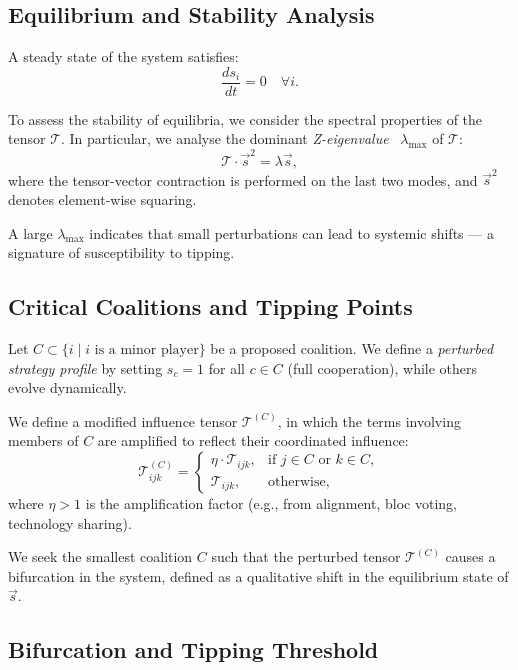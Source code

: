 \documentclass[11pt]{article}
\begin{document}
\subsection{Equilibrium and Stability Analysis}

A steady state of the system satisfies:
\begin{equation}
	\frac{ds_i}{dt} = 0 \quad \forall i.
\end{equation}

To assess the stability of equilibria, we consider the spectral properties of the tensor $\mathcal{T}$. In particular, we analyse the dominant \textit{Z-eigenvalue}~\citep{qi2005eigenvalues} $\lambda_{\max}$ of $\mathcal{T}$:
\begin{equation}
	\mathcal{T} \cdot \vec{s}^2 = \lambda \vec{s},
\end{equation}
where the tensor-vector contraction is performed on the last two modes, and $\vec{s}^2$ denotes element-wise squaring.

A large $\lambda_{\max}$ indicates that small perturbations can lead to systemic shifts — a signature of susceptibility to tipping.

\subsection{Critical Coalitions and Tipping Points}

Let $C \subset \{i \mid i \text{ is a minor player} \}$ be a proposed coalition. We define a \textit{perturbed strategy profile} by setting $s_c = 1$ for all $c \in C$ (full cooperation), while others evolve dynamically.

We define a modified influence tensor $\mathcal{T}^{(C)}$, in which the terms involving members of $C$ are amplified to reflect their coordinated influence:
\[
\mathcal{T}^{(C)}_{ijk} = 
\begin{cases}
	\eta \cdot \mathcal{T}_{ijk}, & \text{if } j \in C \text{ or } k \in C, \\
	\mathcal{T}_{ijk}, & \text{otherwise},
\end{cases}
\]
where $\eta > 1$ is the amplification factor (e.g., from alignment, bloc voting, technology sharing).

We seek the smallest coalition $C$ such that the perturbed tensor $\mathcal{T}^{(C)}$ causes a bifurcation in the system, defined as a qualitative shift in the equilibrium state of $\vec{s}$.

\subsection{Bifurcation and Tipping Threshold}
\end{document}
